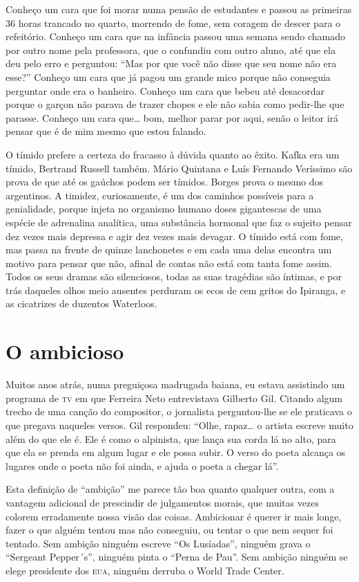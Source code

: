 Conheço um cara que foi morar numa pensão de estudantes e passou as
primeiras 36 horas trancado no quarto, morrendo de fome, sem coragem
de descer para o refeitório. Conheço um cara que na infância passou
uma semana sendo chamado por outro nome pela professora, que o
confundiu com outro aluno, até que ela deu pelo erro e perguntou:
“Mas por que você não disse que seu nome não era esse?” Conheço um
cara que já pagou um grande mico porque não conseguia perguntar onde
era o banheiro.  Conheço um cara que bebeu até desacordar porque o
garçon não parava de trazer chopes e ele não sabia como pedir-lhe que
parasse. Conheço um cara que… bom, melhor parar por aqui, senão o
leitor irá pensar que é de mim mesmo que estou falando.

O tímido prefere a certeza do fracasso à dúvida quanto ao êxito. Kafka
era um tímido, Bertrand Russell também. Mário Quintana e Luís
Fernando Veríssimo são prova de que até os gaúchos podem ser tímidos.
Borges prova o mesmo dos argentinos. A timidez, curiosamente, é um
dos caminhos possíveis para a genialidade, porque injeta no organismo
humano doses gigantescas de uma espécie de adrenalina analítica, uma
substância hormonal que faz o sujeito pensar dez vezes mais depressa
e agir dez vezes mais devagar. O tímido está com fome, mas passa na
frente de quinze lanchonetes e em cada uma delas encontra um motivo
para pensar que não, afinal de contas não está com tanta fome assim.
Todos os seus dramas são silenciosos, todas as suas tragédias são
íntimas, e por trás daqueles olhos meio ausentes perduram os ecos de
cem gritos do Ipiranga, e as cicatrizes de duzentos Waterloos.

\chapter{O ambicioso}

Muitos anos atrás, numa preguiçosa madrugada baiana, eu estava
assistindo um programa de \textsc{tv} em que Ferreira Neto entrevistava
Gilberto Gil. Citando algum trecho de uma canção do compositor, o
jornalista perguntou-lhe se ele praticava o que pregava naqueles
versos. Gil respondeu: “Olhe, rapaz… o artista escreve muito além do
que ele é. Ele é como o alpinista, que lança sua corda lá no alto,
para que ela se prenda em algum lugar e ele possa subir. O verso do
poeta alcança os lugares onde o poeta não foi ainda, e ajuda o poeta
a chegar lá”.

Esta definição de “ambição” me parece tão boa quanto qualquer outra,
com a vantagem adicional de prescindir de julgamentos morais, que
muitas vezes colorem erradamente nossa visão das coisas. Ambicionar é
querer ir mais longe, fazer o que alguém tentou mas não conseguiu, ou
tentar o que nem sequer foi tentado. Sem ambição ninguém escreve “Os
Lusíadas”, ninguém grava o “Sergeant Pepper´s”, ninguém pinta o
“Perna de Pau”.  Sem ambição ninguém se elege presidente dos \textsc{eua},
ninguém derruba o World Trade Center.

